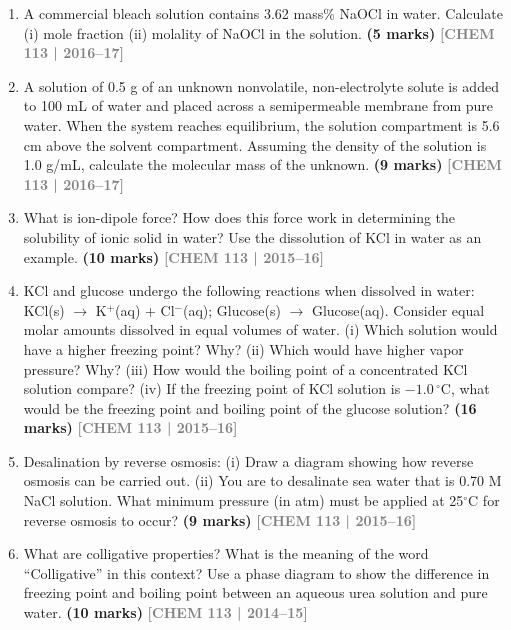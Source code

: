 \documentclass[12pt,a3paper]{article}
\newcommand{\yr}[1]{\hfill\textcolor{gray}{\small\textbf{[#1]}}}
\newcommand{\mk}[1]{\textcolor{orange!70!black}{\small\textbf{(#1 marks)}}}
\begin{document}
\begin{enumerate}
\item A commercial bleach solution contains 3.62 mass\% NaOCl in water. Calculate (i) mole fraction (ii) molality of NaOCl in the solution. \mk{5}
\yr{CHEM 113 | 2016--17}



\item A solution of 0.5 g of an unknown nonvolatile, non-electrolyte solute is added to 100 mL of water and placed across a semipermeable membrane from pure water. When the system reaches equilibrium, the solution compartment is 5.6 cm above the solvent compartment. Assuming the density of the solution is 1.0 g/mL, calculate the molecular mass of the unknown. \mk{9}
\yr{CHEM 113 | 2016--17}



\item What is ion-dipole force? How does this force work in determining the solubility of ionic solid in water? Use the dissolution of KCl in water as an example. \mk{10}
\yr{CHEM 113 | 2015--16}



\item KCl and glucose undergo the following reactions when dissolved in water: KCl(s) $\rightarrow$ K$^+$(aq) + Cl$^-$(aq); Glucose(s) $\rightarrow$ Glucose(aq). Consider equal molar amounts dissolved in equal volumes of water. (i) Which solution would have a higher freezing point? Why? (ii) Which would have higher vapor pressure? Why? (iii) How would the boiling point of a concentrated KCl solution compare? (iv) If the freezing point of KCl solution is $-1.0\,^\circ$C, what would be the freezing point and boiling point of the glucose solution? \mk{16}
\yr{CHEM 113 | 2015--16}



\item Desalination by reverse osmosis: (i) Draw a diagram showing how reverse osmosis can be carried out. (ii) You are to desalinate sea water that is 0.70 M NaCl solution. What minimum pressure (in atm) must be applied at 25$^\circ$C for reverse osmosis to occur? \mk{9}
\yr{CHEM 113 | 2015--16}



\item What are colligative properties? What is the meaning of the word ``Colligative'' in this context? Use a phase diagram to show the difference in freezing point and boiling point between an aqueous urea solution and pure water. \mk{10}
\yr{CHEM 113 | 2014--15}




\end{enumerate}
\end{document}
